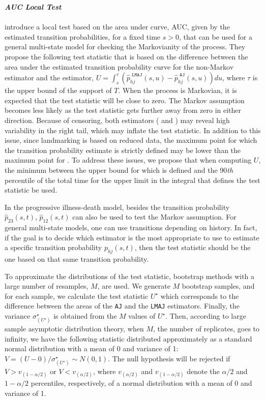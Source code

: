 \textit{\textbf{AUC Local Test}}\\\\
\cite{soutinho_machado2020} introduce a local test based on the area under curve, AUC, given by the estimated transition probabilities, for a fixed time $s>0$, that can be used for a general multi-state model for checking the Markovianity of the process. They propose the following test statistic that is based on the difference between the area under the estimated transition probability curve for the non-Markov  estimator and the  estimator, $U=\int_{s}^{\tau}
\left(\widehat p_{hj}^{\texttt{ LMAJ}}(s,u) - \widehat p_{hj}^{\texttt{ AJ}}(s,u)\right)du$, where $\tau$ is the upper bound of the support of $T$. When the process is Markovian, it is expected that the test statistic will be close to zero. The Markov assumption becomes less likely as the test statistic gets further away from zero in either direction. Because of censoring, both estimators ( and ) may reveal high variability in the right tail, which may inflate the test statistic. In addition to this issue, since landmarking is based on reduced data, the maximum point for which the  transition probability estimate is strictly defined may be lower than the maximum point for . To address these issues, we propose that when computing $U$, the minimum between the upper bound for which  is defined and the 90\textit{th} percentile of the total time for the upper limit in the integral that defines the test statistic be used.

In the progressive illness-death model, besides the transition probability $\widehat p_{23}(s,t)$, $\widehat p_{12}(s,t)$ can also be used to test the Markov assumption. For general multi-state models, one can use transitions depending on history. In fact, if the goal is to decide which estimator is the most appropriate to use to estimate a specific transition probability $p_{hj}(s,t)$, then the test statistic should be the one based on that same transition probability.

To approximate the distributions of the test statistic, bootstrap methods with a large number of resamples, $M$, are used. We generate $M$ bootstrap samples, and for each sample, we calculate the test statistic $U^{\star}$ which corresponds to the difference between the areas of the \texttt{AJ} and the \texttt{LMAJ} estimators. Finally, the variance $\sigma^{\star}_{(U^{\star})}$ is obtained from the $M$ values of $U^{\star}$. Then, according to large sample asymptotic distribution theory, when $M$, the number of replicates, goes to infinity, we have the following statistic distributed approximately as a standard normal distribution with a mean of 0 and variance of 1:
$V=(U-0)/\sigma^{\star}_{(U^{\star})}\sim N(0,1)$. The null hypothesis will be rejected if $V>v_{(1-\alpha/2)}$ or $V<v_{(\alpha/2)}$, where $v_{(\alpha/2)}$ and $v_{(1-\alpha/2)}$ denote the $\alpha/2$ and $1-\alpha/2$ percentiles, respectively, of a normal distribution with a mean of 0 and variance of 1.\\

